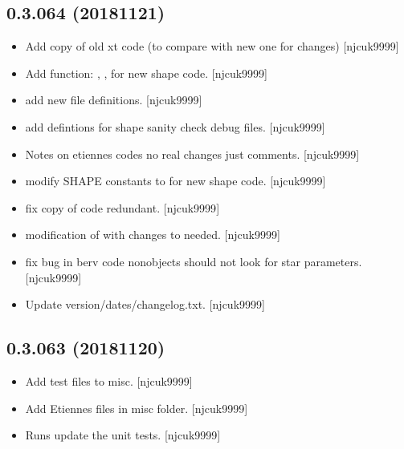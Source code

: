 \documentclass[a4paper,10pt,english]{report}
\begin{document}
\subsection{0.3.064 (2018\sphinxhyphen{}11\sphinxhyphen{}21)}
\label{\detokenize{misc/changelog:id277}}\begin{itemize}
\item {} 
Add copy of old xt code (to compare with new one for changes)
{[}njcuk9999{]}

\item {} 
Add function: , ,  for
new shape code. {[}njcuk9999{]}

\item {} 
 \sphinxhyphen{} add new file definitions. {[}njcuk9999{]}

\item {} 
 \sphinxhyphen{} add defintions for shape sanity check debug files.
{[}njcuk9999{]}

\item {} 
Notes on etiennes codes \sphinxhyphen{} no real changes just comments. {[}njcuk9999{]}

\item {} 
 \sphinxhyphen{} modify SHAPE constants to for new shape
code. {[}njcuk9999{]}

\item {} 
 \sphinxhyphen{} fix copy of code \sphinxhyphen{} redundant. {[}njcuk9999{]}

\item {} 
 \sphinxhyphen{} modification of  with
changes to  needed. {[}njcuk9999{]}

\item {} 
 \sphinxhyphen{} fix bug in berv code \sphinxhyphen{} non\sphinxhyphen{}objects should not look for
star parameters. {[}njcuk9999{]}

\item {} 
Update version/dates/changelog.txt. {[}njcuk9999{]}

\end{itemize}


\subsection{0.3.063 (2018\sphinxhyphen{}11\sphinxhyphen{}20)}
\label{\detokenize{misc/changelog:id278}}\begin{itemize}
\item {} 
Add test files to misc. {[}njcuk9999{]}

\item {} 
Add Etiennes files in misc folder. {[}njcuk9999{]}

\item {} 
Runs \sphinxhyphen{} update the unit tests. {[}njcuk9999{]}

\end{itemize}
\end{document}
